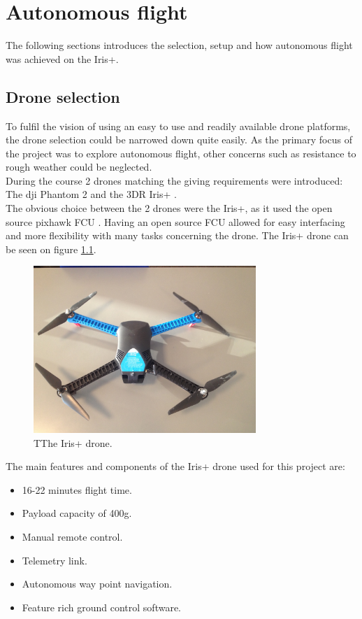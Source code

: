 \chapter{Autonomous flight}
The following sections introduces the selection, setup and how autonomous flight was achieved on the
Iris+.

\section{Drone selection}
To fulfil the vision of using an easy to use and readily available drone platforms,
the drone selection could be narrowed down quite easily. As the primary focus of the project was to
explore autonomous flight, other concerns such as resistance to rough weather could be neglected. \\
During the course 2 drones matching the giving requirements were introduced: The dji Phantom 2
\cite{Ref:dji} and the 3DR Iris+ \cite{Ref:3dr}.\\
The obvious choice between the 2 drones were the Iris+, as it used the open source pixhawk FCU
\cite{Ref:px4}. Having an open source FCU allowed for easy interfacing and more flexibility with
many tasks concerning the drone. The Iris+ drone can be seen on figure \ref{fig:iris}.\\

\begin{figure}[H]
  \centering
    \includegraphics[width=0.75\textwidth]{./Images/iris}
  \caption{TThe Iris+ drone.}
  \label{fig:iris}
\end{figure}

\newpage

The main features and components of the Iris+ drone used for this project are:
\begin{itemize}
\item 16-22 minutes flight time.
\item Payload capacity of 400g.
\item Manual remote control.
\item Telemetry link.
\item Autonomous way point navigation.
\item Feature rich ground control software.
\end{itemize}




